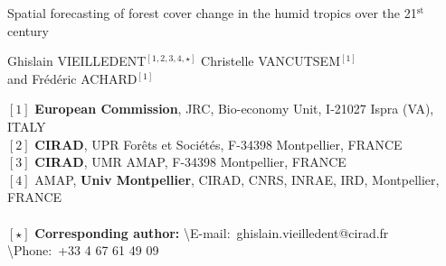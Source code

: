 \renewcommand{\bibsection}{}  %

\begin{center}
  \LARGE{Spatial forecasting of forest cover change in the humid tropics over the 21$^{\text{st}}$ century}
\end{center}

\vspace{1cm}

\begin{center}
  \large{
  Ghislain VIEILLEDENT$^{[1, 2, 3, 4, \star]}$ \hspace{0.5cm} Christelle VANCUTSEM$^{[1]}$\\
  \vspace{0.5cm}
  and \hspace{0.5cm} Frédéric ACHARD$^{[1]}$
  }
\end{center}

\vspace{1cm}

{\small
  \begin{flushleft}  
    $[1]$ \textbf{European Commission}, JRC, Bio-economy Unit, I-21027 Ispra (VA), ITALY\\
    $[2]$ \textbf{CIRAD}, UPR Forêts et Sociétés, F-34398 Montpellier, FRANCE\\
    $[3]$ \textbf{CIRAD}, UMR AMAP, F-34398 Montpellier, FRANCE\\
    $[4]$ AMAP, \textbf{Univ Montpellier}, CIRAD, CNRS, INRAE, IRD, Montpellier, FRANCE\\
    ~\\
    $[\star]$ \textbf{Corresponding author:}
    \textbackslash{E-mail}:~ghislain.vieilledent@cirad.fr
    \textbackslash{Phone}:~+33 4 67 61 49 09\\
  \end{flushleft}}


